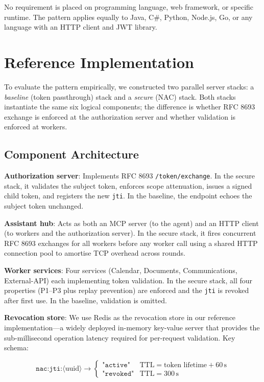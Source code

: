 \documentclass[journal]{IEEEtran}
\begin{document}
No requirement is placed on programming language, web framework, or specific
runtime. The pattern applies equally to Java, C\#, Python, Node.js, Go, or any
language with an HTTP client and JWT library.


\section{Reference Implementation}
\label{sec:impl}

To evaluate the pattern empirically, we constructed two parallel server stacks:
a \textit{baseline} (token passthrough) stack and a \textit{secure} (NAC) stack.
Both stacks instantiate the same six logical components; the difference is whether
RFC 8693 exchange is enforced at the authorization server and whether validation
is enforced at workers.

\subsection{Component Architecture}

\textbf{Authorization server}: Implements RFC 8693 \texttt{/token/exchange}.
In the secure stack, it validates the subject token, enforces scope attenuation,
issues a signed child token, and registers the new \texttt{jti}. In the baseline,
the endpoint echoes the subject token unchanged.

\textbf{Assistant hub}: Acts as both an MCP server (to the agent) and an HTTP
client (to workers and the authorization server). In the secure stack, it fires
concurrent RFC 8693 exchanges for all workers before any worker call using a
shared HTTP connection pool to amortise TCP overhead across rounds.

\textbf{Worker services}: Four services (Calendar, Documents, Communications,
External-API) each implementing token validation. In the secure stack, all four
properties (P1--P3 plus replay prevention) are enforced and the \texttt{jti} is
revoked after first use. In the baseline, validation is omitted.

\textbf{Revocation store}: We use Redis \cite{redis} as the revocation store
in our reference implementation---a widely deployed in-memory key-value server
that provides the sub-millisecond operation latency required for per-request
validation. Key schema:

\begin{equation}
\texttt{nac:jti:}\langle\text{uuid}\rangle \to
\begin{cases}
  \texttt{"active"}  & \text{TTL} = \text{token lifetime} + 60\,\text{s} \\
  \texttt{"revoked"} & \text{TTL} = 300\,\text{s}
\end{cases}
\end{equation}
\end{document}
